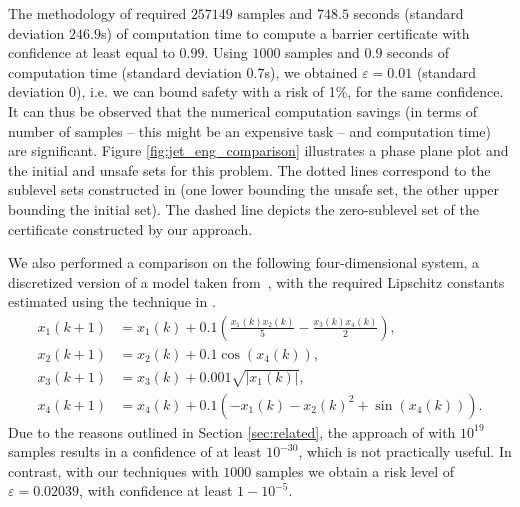 The methodology of \cite{DBLP:journals/tac/NejatiLJSZ23} required $257149$ samples and $748.5$ seconds (standard deviation $246.9$s) of computation time to compute a barrier certificate with confidence at least equal to $0.99$. 
Using $1000$ samples and $0.9$ seconds of computation time (standard deviation $0.7$s), we obtained $\varepsilon = 0.01$ (standard deviation $0$), i.e. we can bound safety with a risk of 1\%, for the same confidence.
It can thus be observed that the numerical computation savings (in terms of number of samples -- this might be an expensive task -- and computation time) are significant. Figure \ref{fig:jet_eng_comparison} illustrates a phase plane plot and the initial and unsafe sets for this problem. The dotted lines correspond to the sublevel sets constructed in \cite{DBLP:journals/tac/NejatiLJSZ23} (one lower bounding the unsafe set, the other upper bounding the initial set). 
The dashed line depicts the zero-sublevel set of the certificate constructed by our approach.

We also performed a comparison on the following four-dimensional system, a discretized version of a model taken from~\cite{DBLP:conf/hybrid/EdwardsPA24}, with the required Lipschitz constants estimated using the technique in \cite{DBLP:journals/jgo/WoodZ96}.
\begin{equation}
\begin{aligned}
        x_1(k+1) &= x_1(k) + 0.1\left(\frac{x_1(k)  x_2(k)}{5} -\frac{x_3(k)x_4(k)}{2}\right),\\
        x_2(k+1) &= x_2(k)+0.1\cos(x_4(k)),\\
        x_3(k+1) &= x_3(k)+0.001\sqrt{|x_1(k)|},\\
        x_4(k+1) &= x_4(k)+0.1\left(-x_1(k) - x_2(k)^2 + \sin(x_4(k))\right).
\end{aligned}
\end{equation}
Due to the reasons outlined in Section \ref{sec:related}, the approach of \cite{DBLP:journals/tac/NejatiLJSZ23} with $10^{19}$ samples results in a confidence of at least $10^{-30}$, which is not practically useful.
In contrast, with our techniques with $1000$ samples we obtain a risk level of $\varepsilon = 0.02039$, with confidence at least $1-10^{-5}$.
